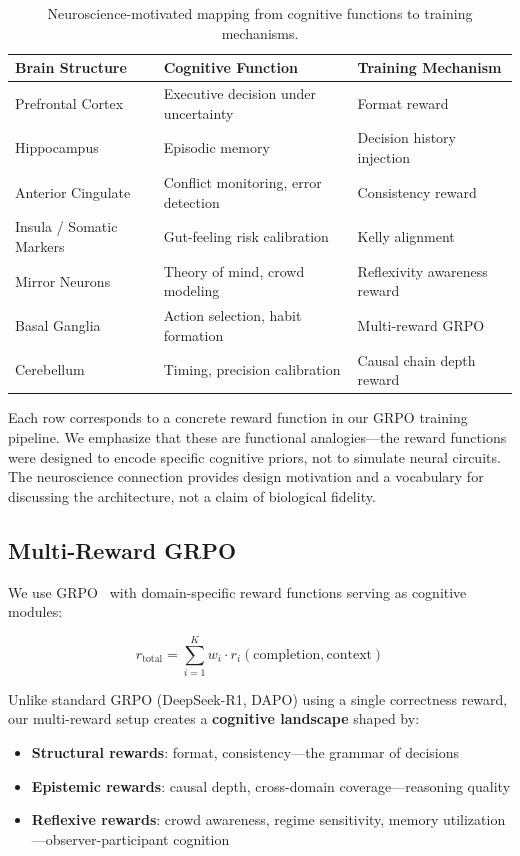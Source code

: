 \documentclass[11pt,a4paper]{article}
\begin{document}
\begin{table}[h]
\centering
\caption{Neuroscience-motivated mapping from cognitive functions to training mechanisms.}
\label{tab:architecture}
\begin{tabular}{@{}lll@{}}
\toprule
\textbf{Brain Structure} & \textbf{Cognitive Function} & \textbf{Training Mechanism} \\
\midrule
Prefrontal Cortex & Executive decision under uncertainty & Format reward \\
Hippocampus & Episodic memory & Decision history injection \\
Anterior Cingulate & Conflict monitoring, error detection & Consistency reward \\
Insula / Somatic Markers & Gut-feeling risk calibration & Kelly alignment \\
Mirror Neurons & Theory of mind, crowd modeling & Reflexivity awareness reward \\
Basal Ganglia & Action selection, habit formation & Multi-reward GRPO \\
Cerebellum & Timing, precision calibration & Causal chain depth reward \\
\bottomrule
\end{tabular}
\end{table}

Each row corresponds to a concrete reward function in our GRPO training pipeline. We emphasize that these are functional analogies---the reward functions were designed to encode specific cognitive priors, not to simulate neural circuits. The neuroscience connection provides design motivation and a vocabulary for discussing the architecture, not a claim of biological fidelity.

\subsection{Multi-Reward GRPO}

We use GRPO~\citep{shao2024} with domain-specific reward functions serving as cognitive modules:

\begin{equation}
r_{\text{total}} = \sum_{i=1}^{K} w_i \cdot r_i(\text{completion}, \text{context})
\end{equation}

Unlike standard GRPO (DeepSeek-R1, DAPO) using a single correctness reward, our multi-reward setup creates a \textbf{cognitive landscape} shaped by:
\begin{itemize}[leftmargin=*]
\item \textbf{Structural rewards}: format, consistency---the grammar of decisions
\item \textbf{Epistemic rewards}: causal depth, cross-domain coverage---reasoning quality
\item \textbf{Reflexive rewards}: crowd awareness, regime sensitivity, memory utilization---observer-participant cognition
\end{itemize}
\end{document}

